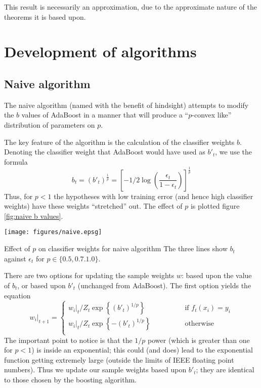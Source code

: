 This result is necessarily an approximation, due to the approximate
nature of the theorems it is based upon.

\section{Development of algorithms}

\subsection{Naive algorithm}

The naive algorithm (named with the benefit of hindsight) attempts to
modify the $b$ values of AdaBoost in a manner that will produce a
``$p$-convex like'' distribution of parameters on $p$.

The key feature of the algorithm is the calculation of the classifier
weights $b$.  Denoting the classifier weight that AdaBoost would have
used as $b'_t$, we use the formula
%
\begin{equation}
b_t = (b'_t)^{\frac{1}{p}} = \left[ - 1/2 \log \left( \frac{\epsilon_t}{1
- \epsilon_t} \right) \right]^\frac{1}{p}
\end{equation}
%
Thus, for $p < 1$ the hypotheses with low training error (and hence
high classifier weights) have these weights ``stretched'' out.  The
effect of $p$ is plotted figure \ref{fig:naive b values}.

\begin{linefigure}
\begin{center}
\texttt{[image: figures/naive.epsg]}
\end{center}
\begin{capt}{Effect of $p$ on classifier weights for naive algorithm}
The three lines show $b_t$ against $\epsilon_t$ for $p \in \{ 0.5,
0.7. 1.0 \}$.
\end{capt}
\label{fig:naive b values}
\end{linefigure}

There are two options for updating the sample weights $w$: based upon
the value of $b_t$, or based upon $b'_t$ (unchanged from AdaBoost).
The first option yields the equation
%
\begin{equation}
w_i|_{t+1} = \left\{
\begin{array}{cl}
	w_i|_t / Z_t \exp \left\{ (b'_t)^{1/p} \right\} & \qquad \qquad \mbox{if
	$f_t(x_i) = y_i$} \\
	w_i|_t / Z_t \exp \left\{ -(b'_t)^{1/p} \right\} 	& \qquad \qquad
	\mbox{otherwise} \\
\end{array} \right.
\end{equation}
%
The important point to notice is that the $1/p$ power (which is
greater than one for $p < 1$) is inside an exponential; this could
(and does) lead to the exponential function getting extremely large
(outside the limits of IEEE floating point numbers).  Thus we update
our sample weights based upon $b'_t$; they are identical to those
chosen by the boosting algorithm.

